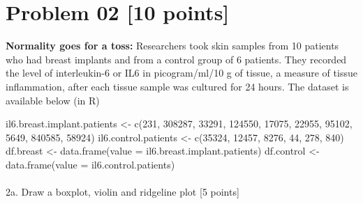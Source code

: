 \documentclass[
  letterpaper,
  DIV=11,
  numbers=noendperiod]{scrartcl}
\makeatletter
\let\oldparagraph\paragraph
\renewcommand{\paragraph}{
    \@ifstar
      \xxxParagraphStar
      \xxxParagraphNoStar
  }
\newcommand{\xxxParagraphStar}[1]{\oldparagraph*{#1}\mbox{}}
\newcommand{\xxxParagraphNoStar}[1]{\oldparagraph{#1}\mbox{}}
\newenvironment{Shaded}{\begin{snugshade}}{\end{snugshade}}
\newcommand{\AttributeTok}[1]{\textcolor[rgb]{0.40,0.45,0.13}{#1}}
\newcommand{\DecValTok}[1]{\textcolor[rgb]{0.68,0.00,0.00}{#1}}
\newcommand{\FunctionTok}[1]{\textcolor[rgb]{0.28,0.35,0.67}{#1}}
\newcommand{\NormalTok}[1]{\textcolor[rgb]{0.00,0.23,0.31}{#1}}
\newcommand{\OtherTok}[1]{\textcolor[rgb]{0.00,0.23,0.31}{#1}}
\makeatother
\begin{document}
\section{Problem 02 {[}10 points{]}}\label{problem-02-10-points}

\textbf{Normality goes for a toss:} Researchers took skin samples from
10 patients who had breast implants and from a control group of 6
patients. They recorded the level of interleukin-6 or IL6 in
picogram/ml/10 g of tissue, a measure of tissue inflammation, after each
tissue sample was cultured for 24 hours. The dataset is available below
(in R)

\begin{Shaded}
\begin{Highlighting}[]
\NormalTok{il6.breast.implant.patients }\OtherTok{\textless{}{-}} \FunctionTok{c}\NormalTok{(}\DecValTok{231}\NormalTok{, }\DecValTok{308287}\NormalTok{, }\DecValTok{33291}\NormalTok{, }\DecValTok{124550}\NormalTok{, }\DecValTok{17075}\NormalTok{,}
                                 \DecValTok{22955}\NormalTok{, }\DecValTok{95102}\NormalTok{, }\DecValTok{5649}\NormalTok{, }\DecValTok{840585}\NormalTok{, }\DecValTok{58924}\NormalTok{)}
\NormalTok{il6.control.patients }\OtherTok{\textless{}{-}} \FunctionTok{c}\NormalTok{(}\DecValTok{35324}\NormalTok{, }\DecValTok{12457}\NormalTok{, }\DecValTok{8276}\NormalTok{, }\DecValTok{44}\NormalTok{, }\DecValTok{278}\NormalTok{, }\DecValTok{840}\NormalTok{)}
\NormalTok{df.breast }\OtherTok{\textless{}{-}} \FunctionTok{data.frame}\NormalTok{(}\AttributeTok{value =}\NormalTok{ il6.breast.implant.patients)}
\NormalTok{df.control }\OtherTok{\textless{}{-}} \FunctionTok{data.frame}\NormalTok{(}\AttributeTok{value =}\NormalTok{ il6.control.patients)}
\end{Highlighting}
\end{Shaded}

\paragraph{2a. Draw a boxplot, violin and ridgeline plot {[}5
points{]}}\label{a.-draw-a-boxplot-violin-and-ridgeline-plot-5-points}
\end{document}
